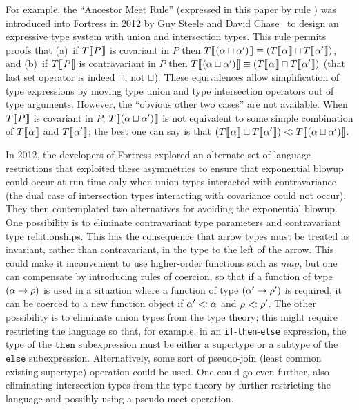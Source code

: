 For example, the ``Ancestor Meet Rule''
(expressed in this paper by rule ) was introduced
into Fortress in 2012 by Guy Steele and David Chase~\cite{dchase12} to
design an expressive type system with union and intersection types.  This rule
permits proofs that (a)~if $T\ob{P}$ is covariant in $P$ then
$T\ob{\intersectiontype{\alpha}{\alpha'}}\equiv \intersectiontype{T\ob{\alpha}}{T\ob{\alpha'}}$, and
(b)~if $T\ob{P}$ is contravariant in $P$ then
$T\ob{\uniontype{\alpha}{\alpha'}}\equiv \intersectiontype{T\ob{\alpha}}{T\ob{\alpha'}}$
(that last set operator is indeed $\sqcap$, not $\sqcup$).
These equivalences allow simplification of type expressions by moving type union
and type intersection operators out of type arguments.
However, the ``obvious other two cases'' are not available.
When $T\ob{P}$ is covariant in $P$, $T\ob{\uniontype{\alpha}{\alpha'}}$
is not equivalent to some simple combination of $T\ob{\alpha}$ and $T\ob{\alpha'}$;
the best one can say is that $\uniontype{T\ob{\alpha}}{T\ob{\alpha'}} \subtypeof T\ob{\uniontype{\alpha}{\alpha'}}$.

In 2012, the developers of Fortress explored an alternate set of language restrictions
that exploited these asymmetries to ensure that exponential blowup could occur at run time
only when union types interacted with contravariance (the dual case of intersection types
interacting with covariance could not occur).  They then
contemplated two alternatives for avoiding the exponential blowup.
One possibility is to eliminate contravariant type parameters and contravariant type relationships.
This has the consequence that arrow types must be treated as invariant, rather than contravariant,
in the type to the left of the arrow.
This could make it inconvenient to use higher-order functions such as
$\mathit{map}$, but one can compensate by introducing rules of
coercion, so that if a function of type $\mbox{\ensuremath{(\mbox{\ensuremath{{\alpha} \rightarrow {\rho}}})}}$ is
used in a situation where a function of type $\mbox{\ensuremath{(\mbox{\ensuremath{{\alpha'} \rightarrow {\rho'}}})}}$ is required,
it can be coerced to a new function object if $\alpha'\subtypeof\alpha$ and $\rho\subtypeof\rho'$.
The other possibility is to eliminate union types from the type
theory; this might require restricting the language so that, for
example, in an \texttt{if}-\texttt{then}-\texttt{else}
expression, the type of the $\texttt{then}$ subexpression must be
either a supertype or a subtype of the $\texttt{else}$ subexpression.
Alternatively, some sort of pseudo-join (least common existing supertype) operation could be used.
One could go even further, also eliminating intersection types from the type theory
by further restricting the language and possibly using a pseudo-meet operation.

